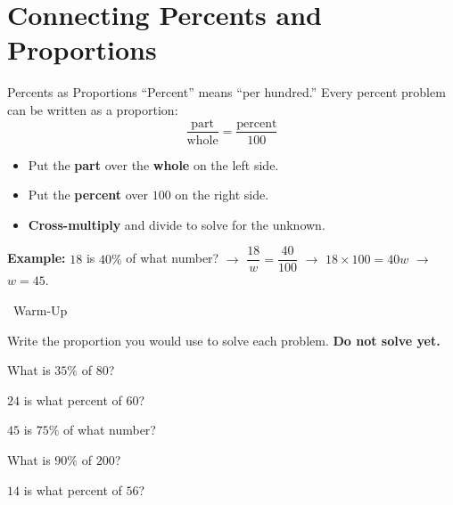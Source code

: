 \section{Connecting Percents and Proportions}

\begin{quickReview}{Percents as Proportions}
``Percent'' means ``per hundred.'' Every percent problem can be written as a proportion:
$$\frac{\text{part}}{\text{whole}} = \frac{\text{percent}}{100}$$

\begin{itemize}[leftmargin=*]
    \item Put the \textbf{part} over the \textbf{whole} on the left side.
    \item Put the \textbf{percent} over $100$ on the right side.
    \item \textbf{Cross-multiply} and divide to solve for the unknown.
\end{itemize}

\medskip
\textbf{Example:} $18$ is $40\%$ of what number? $\to$ $\dfrac{18}{w} = \dfrac{40}{100}$ $\to$ $18 \times 100 = 40w$ $\to$ $w = 45$.
\end{quickReview}

\begin{practiceBox}[funGreen]{\faSun~Warm-Up}

Write the proportion you would use to solve each problem. \textbf{Do not solve yet.}

\prob What is $35\%$ of $80$? \answerBlank[4cm]

\prob $24$ is what percent of $60$? \answerBlank[4cm]

\prob $45$ is $75\%$ of what number? \answerBlank[4cm]

\prob What is $90\%$ of $200$? \answerBlank[4cm]

\prob $14$ is what percent of $56$? \answerBlank[4cm]

\end{practiceBox}

